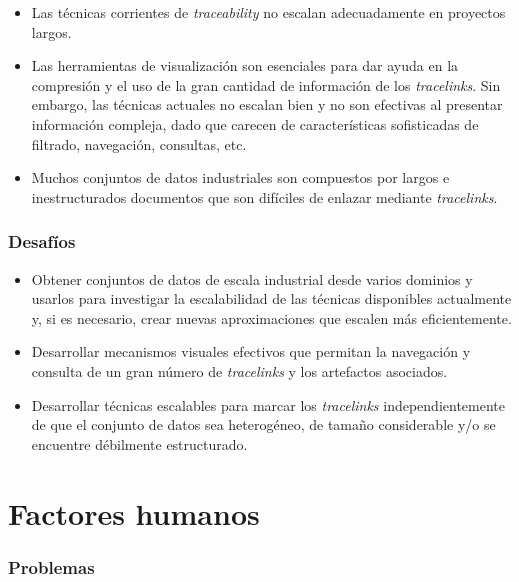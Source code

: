 \documentclass[a4paper,12pt,oneside,spanish]{book}
\begin{document}
\begin{itemize}[label={$\times$}]

\item Las técnicas corrientes de \textit{traceability} no escalan adecuadamente en proyectos largos.

\item Las herramientas de visualización son esenciales para dar ayuda en la compresión y el uso de la gran cantidad de información de los \textit{tracelinks}. Sin embargo, las técnicas actuales no escalan bien y no son efectivas al presentar información compleja, dado que carecen de características sofisticadas de filtrado, navegación, consultas, etc.

\item Muchos conjuntos de datos industriales son compuestos por largos e inestructurados documentos que son difíciles de enlazar mediante \textit{tracelinks}.
\end{itemize}

\subsubsection{Desafíos}

\begin{itemize}[label={\checkmark}]

\item Obtener conjuntos de datos de escala industrial desde varios dominios y usarlos para investigar la escalabilidad de las técnicas disponibles actualmente y, si es necesario, crear nuevas aproximaciones que escalen más eficientemente.

\item Desarrollar mecanismos visuales efectivos que permitan la navegación y consulta de un gran número de \textit{tracelinks} y los artefactos asociados.

\item Desarrollar técnicas escalables para marcar los \textit{tracelinks} independientemente de que el conjunto de datos sea heterogéneo, de tamaño considerable y/o se encuentre débilmente estructurado.

\end{itemize}


\section{Factores humanos}

\subsubsection{Problemas}
\end{document}
